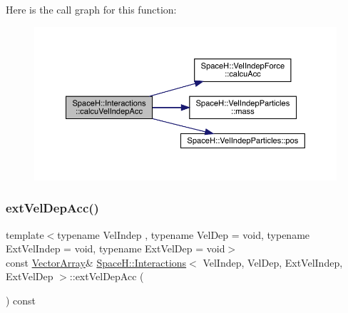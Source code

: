 Here is the call graph for this function\+:
\nopagebreak
\begin{figure}[H]
\begin{center}
\leavevmode
\includegraphics[width=350pt]{class_space_h_1_1_interactions_a80aac6bfbb89e22788cff413ee62db1c_cgraph}
\end{center}
\end{figure}
\mbox{\label{class_space_h_1_1_interactions_a0513d1e434ad7c7eefeb57d1cd8f45f8}} 
\subsubsection{\texorpdfstring{ext\+Vel\+Dep\+Acc()}{extVelDepAcc()}\hspace{0.1cm}{\footnotesize\ttfamily [1/2]}}
{\footnotesize\ttfamily template$<$typename Vel\+Indep , typename Vel\+Dep  = void, typename Ext\+Vel\+Indep  = void, typename Ext\+Vel\+Dep  = void$>$ \\
const \mbox{\hyperlink{class_space_h_1_1_interactions_ac9d9b24b469c4be73b96ce0f09f93fcf}{Vector\+Array}}\& \mbox{\hyperlink{class_space_h_1_1_interactions}{Space\+H\+::\+Interactions}}$<$ Vel\+Indep, Vel\+Dep, Ext\+Vel\+Indep, Ext\+Vel\+Dep $>$\+::ext\+Vel\+Dep\+Acc (\begin{DoxyParamCaption}{ }\end{DoxyParamCaption}) const\hspace{0.3cm}{\ttfamily [inline]}}

